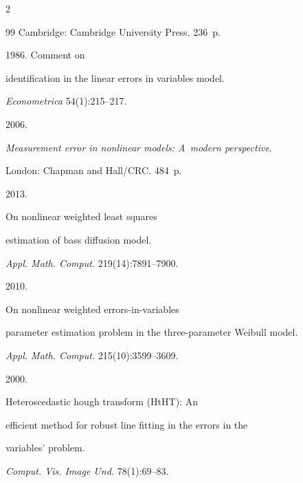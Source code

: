\begin{multicols}{2}
{{\begin{thebibliography}{99}
Cambridge: Cambridge University Press. 236~p.




 1986. Comment on

  identification in the linear errors in variables model.

\textit{Econometrica} 54(1):215--217.




 2006.

\textit{Measurement error in nonlinear models: A~modern perspective}.

London: Chapman and Hall/CRC. 484~p.




 2013.

On nonlinear weighted least squares

  estimation of bass diffusion model.

\textit{Appl. Math. Comput.}  219(14):7891--7900.




 2010.

On nonlinear weighted errors-in-variables

  parameter estimation problem in the three-parameter Weibull model.

\textit{Appl. Math. Comput.} 215(10):3599--3609.




 2000.

Heteroscedastic hough transform (HtHT): An

  efficient method for robust line fitting in the errors in the

  variables' problem.

\textit{Comput. Vis. Image Und.} 78(1):69--83.






\end{thebibliography}}}
\end{multicols}
